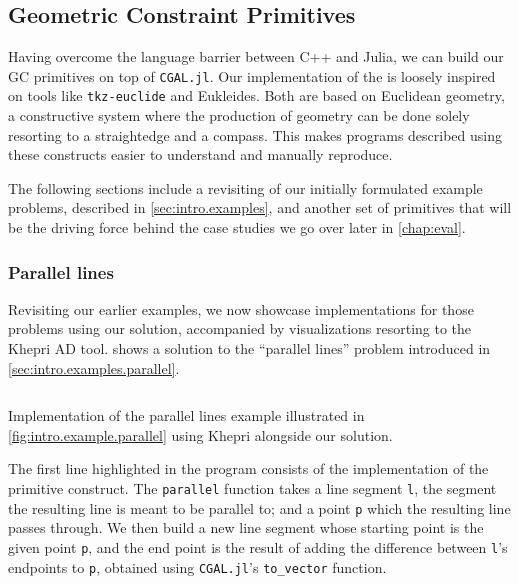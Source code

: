 \subsection{Geometric Constraint Primitives}%
\label{sec:solution.impl.gcps}

Having overcome the language barrier between C++ and Julia, we can build our
\ac{GC} primitives on top of \texttt{CGAL.jl}.  Our implementation of the
\primitives{} is loosely inspired on tools like \texttt{tkz-euclide} and
Eukleides.  Both are based on Euclidean geometry, a constructive system where
the production of geometry can be done solely resorting to a straightedge and a
compass.  This makes programs described using these constructs easier to
understand and manually reproduce.

The following sections include a revisiting of our initially formulated example 
problems, described in \cref{sec:intro.examples}, and another set of primitives
that will be the driving force behind the case studies we go over later in
\cref{chap:eval}.

\subsubsection{Parallel lines}%
\label{sec:solution.impl.gcps.parallel}

Revisiting our earlier examples, we now showcase implementations for those
problems using our solution, accompanied by visualizations resorting to the
Khepri \ac{AD} tool.   shows a solution to
the ``parallel lines'' problem introduced in \cref{sec:intro.examples.parallel}.

\begin{listing}[htbp]
  \inputminted[highlightlines={5,8-9,19}]{julia}{jl/ex_parallel.jl}
  \caption[Parallel lines example using our solution]{
    Implementation of the parallel lines example illustrated in
    \cref{fig:intro.example.parallel} using Khepri alongside our solution.}%
  \label{lst:solution.impl.gcps.parallel}
\end{listing}

The first line highlighted in the program consists of the implementation of the
primitive construct.  The \texttt{parallel} function takes a line segment
\texttt{l}, the segment the resulting line is meant to be parallel to; and a
point \texttt{p} which the resulting line passes through.  We then build a new
line segment whose starting point is the given point \texttt{p}, and the end
point is the result of adding the difference between \texttt{l}'s endpoints to
\texttt{p}, obtained using \texttt{CGAL.jl}'s \texttt{to\_vector} function.

